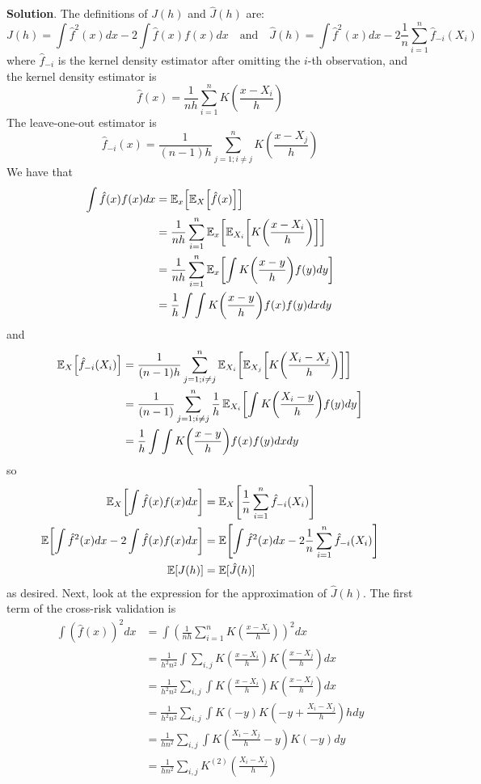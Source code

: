 \textbf{Solution}. The definitions of \(J(h)\) and \(\hat{J}(h)\) are:
\[
J(h) = \int \hat{f}^{2}(x) dx - 2 \int \hat{f}(x) f(x) dx 
\quad \text{and} \quad
\hat{J}(h) = \int \hat{f}^{2}(x) dx - 2 \frac{1}{n} \sum_{i=1}^{n} \hat{f}_{-i}(X_{i})
\]
where \(\hat{f}_{-i}\) is the kernel density estimator after omitting
the \(i\)-th observation, and the kernel density estimator is
\[
\hat{f}(x) = \frac{1}{nh} \sum_{i=1}^{n} K\left( \frac{x - X_{i}}{h} \right)
\]
The leave-one-out estimator is
\[
\hat{f}_{-i}(x) = \frac{1}{(n - 1) h} \sum_{j=1; i \neq j}^{n} K \left( \frac{x - X_{j}}{h} \right)
\]
We have that
\begin{align*}
\int \hat{f}(x) f(x) dx &=  \EXP_x \left[ \EXP_{X}\left[\hat{f}(x)\right] \right] \\
&= \frac{1}{nh} \sum_{i=1}^{n} \EXP_x\left[\EXP_{X_{i}}\left[K \left( \frac{x - X_{i}}{h} \right) \right] \right]  \\
&= \frac{1}{nh} \sum_{i=1}^{n} \EXP_x\left[ \int K \left( \frac{x - y}{h} \right) f(y) dy \right] \\
&= \frac{1}{h} \int \int K \left( \frac{x - y}{h} \right) f(x) f(y) dx  dy
\end{align*}
and
\begin{align*}
\EXP_X\left[ \hat{f}_{-i}(X_{i}) \right] &=
\frac{1}{(n - 1) h} \sum_{j=1; i \neq j}^{n} \EXP_{X_{i}}\left[ \EXP_{X_{j}}\left[ K \left( \frac{X_{i} - X_{j}}{h} \right) \right] \right] \\
&= \frac{1}{(n - 1)} \sum_{j=1; i \neq j}^{n} \frac{1}{h} \EXP_{X_{i}}\left[ \int K \left( \frac{X_{i} - y}{h} \right) f(y) dy \right] \\
& = \frac{1}{h} \int \int K \left( \frac{x - y}{h} \right) f(x) f(y) dx  dy
\end{align*}
so
\begin{align*}
\EXP_X\left[ \int \hat{f}(x) f(x) dx \right] &= \EXP_X\left[ \frac{1}{n} \sum_{i=1}^{n} \hat{f}_{-i}(X_{i}) \right] \\
\EXP\left[ \int \hat{f}^{2}(x) dx - 2 \int \hat{f}(x) f(x) dx \right] &= \EXP\left[ \int \hat{f}^{2}(x) dx - 2 \frac{1}{n} \sum_{i=1}^{n} \hat{f}_{-i}(X_{i}) \right] \\
\EXP[J(h)] &= \EXP[\hat{J}(h)]
\end{align*}
as desired.
Next,  look at the expression for the approximation of
\(\hat{J}(h)\).
The first term of the cross-risk validation is
\begin{align*}
\int \left(\hat{f}(x)\right)^{2} dx &= \int \left( \frac{1}{nh} \sum_{i=1}^{n} K\left( \frac{x - X_{i}}{h} \right) \right)^{2} dx \\
&= \frac{1}{h^{2}n^{2}} \int \sum_{i, j} K \left(\frac{x - X_{i}}{h}\right) K\left(\frac{x - X_{j}}{h}\right) dx \\
&= \frac{1}{h^{2}n^{2}} \sum_{i, j} \int  K \left(\frac{x - X_{i}}{h}\right) K\left(\frac{x - X_{j}}{h}\right) dx \\
&= \frac{1}{h^{2}n^{2}} \sum_{i, j} \int  K(-y) K\left(-y + \frac{X_{i} - X_{j}}{h} \right) h dy \\
&= \frac{1}{hn^{2}} \sum_{i, j} \int  K\left(\frac{X_{i} - X_{j}}{h} - y \right) K(-y) dy \\
&= \frac{1}{hn^{2}} \sum_{i, j} K^{(2)} \left(\frac{X_{i} - X_{j}}{h} \right)
\end{align*}
